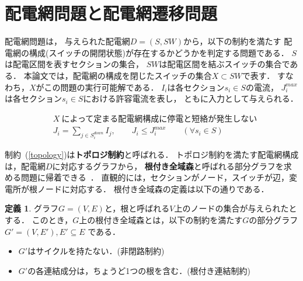 \section{配電網問題と配電網遷移問題}\label{chap:problem}


配電網問題は，
与えられた配電網$D=(S,SW)$から，以下の制約を満たす
配電網の構成(スイッチの開閉状態)が存在するかどうかを判定する問題である．
$S$は配電区間を表すセクションの集合，
$SW$は配電区間を結ぶスイッチの集合である．
本論文では，配電網の構成を閉じたスイッチの集合$X\subset SW$で表す．
すなわち，$X$がこの問題の実行可能解である．
$I_{i}$は各セクション$s_{i}\in S$の電流，
$J_{i}^{max}$は各セクション$s_{i}\in S$における許容電流を表し，
ともに入力として与えられる．

% 
\begin{eqnarray}
& X ~\textrm{によって定まる配電網構成に停電と短絡が発生しない}   \label{topology}\\
& J_i = \displaystyle\sum_{j\in S_i^{down}} I_j, \qquad J_i \leq J_{i}^{max}
  \qquad (\forall s_{i}\in S)\label{electrical}
\end{eqnarray}
%

制約~(\ref{topology})は\textbf{トポロジ制約}と呼ばれる．
トポロジ制約を満たす配電網構成は，配電網$D$に対応するグラフから，
\textbf{根付き全域森}と呼ばれる部分グラフを求める問題に帰着できる~\cite{Minato:dnet:netuki}．
直観的には，セクションがノード，スイッチが辺，変電所が根ノードに対応する．
根付き全域森の定義は以下の通りである．

\theoremstyle{definition}
\newtheorem*{definition*}{定義}
\begin{definition*}
  グラフ$G=(V,E)$と，根と呼ばれる$V$上のノードの集合が与えられたとする．
  このとき，$G$上の根付き全域森とは，以下の制約を満たす$G$の部分グラフ
  $G'=(V,E'), E' \subseteq E$ である．
  \begin{itemize}
  \item $G'$はサイクルを持たない．(非閉路制約)
  \item $G'$の各連結成分は，ちょうど1つの根を含む．(根付き連結制約)
  \end{itemize}
\end{definition*}

